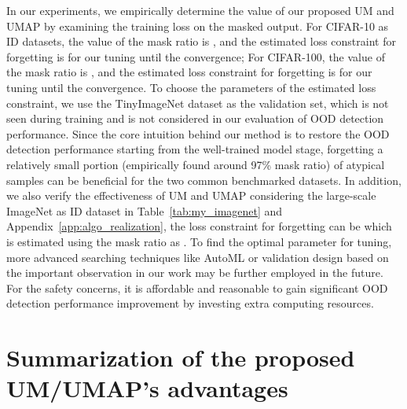 \documentclass{article}
\theoremstyle{plain}
\theoremstyle{definition}
\theoremstyle{remark}
\begin{document}
In our experiments, we empirically determine the value of our proposed UM and UMAP by examining the training loss on the masked output. For CIFAR-10 as ID datasets, the value of the mask ratio is , and the estimated loss constraint for forgetting is  for our tuning until the convergence; For CIFAR-100, the value of the mask ratio is , and the estimated loss constraint for forgetting is  for our tuning until the convergence. To choose the parameters of the estimated loss constraint, we use the TinyImageNet \citep{DBLP:booktitles/corr/abs-2007-06712} dataset as the validation set, which is not seen during training and is not considered in our evaluation of OOD detection performance. Since the core intuition behind our method is to restore the OOD detection performance starting from the well-trained model stage, forgetting a relatively small portion (empirically found around 97\% mask ratio) of atypical samples can be beneficial for the two common benchmarked datasets. In addition, we also verify the effectiveness of UM and UMAP considering the large-scale ImageNet as ID dataset in Table~\ref{tab:my_imagenet} and Appendix~\ref{app:algo_realization}, the loss constraint for forgetting can be  which is estimated using the mask ratio as . To find the optimal parameter for tuning, more advanced searching techniques like AutoML or validation design based on the important observation in our work may be further employed in the future. For the safety concerns, it is affordable and reasonable to gain significant OOD detection performance improvement by investing extra computing resources.

\section{Summarization of the proposed UM/UMAP's advantages}
\end{document}
